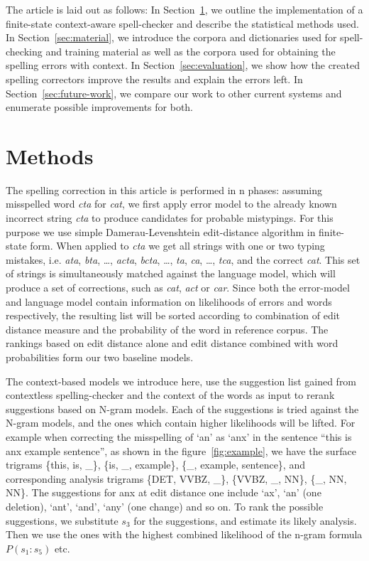 \documentclass{llncs}
\begin{document}
The article is laid out as follows: In Section~\ref{sec:methods}, we outline
the implementation of a finite-state context-aware spell-checker and describe
the statistical methods used.  In Section~\ref{sec:material}, we introduce the
corpora and dictionaries used for spell-checking and training material as well
as the corpora used for obtaining the spelling errors with context. In
Section~\ref{sec:evaluation}, we show how the created spelling correctors
improve the results and explain the errors left. In
Section~\ref{sec:future-work}, we compare our work to other current systems and
enumerate possible improvements for both.

\section{Methods}
\label{sec:methods}

The spelling correction in this article is performed in n phases: assuming 
misspelled word \emph{cta} for \emph{cat}, we first apply error model to
the already known incorrect string \emph{cta} to produce candidates for probable
mistypings. For this purpose we use simple Damerau-Levenshtein edit-distance
algorithm in finite-state form. When applied to \emph{cta} we get all strings
with one or two typing mistakes, i.e. \emph{ata}, \emph{bta}, \ldots, 
\emph{acta}, \emph{bcta}, \ldots, \emph{ta}, \emph{ca}, \ldots, \emph{tca}, and
the correct \emph{cat}. This set of strings is simultaneously matched against
the language model, which will produce a set of corrections, such as 
\emph{cat}, \emph{act} or \emph{car}. Since both the error-model and language
model contain information on likelihoods of errors and words respectively, the
resulting list will be sorted according to combination of edit distance measure
and the probability of the word in reference corpus. The rankings based on
edit distance alone and edit distance combined with word probabilities form
our two baseline models. 

The context-based models we introduce here, use the suggestion list gained
from contextless spelling-checker and the context of the words as input to
rerank suggestions based on N-gram models. Each of the suggestions is tried
against the N-gram models, and the ones which contain higher likelihoods will
be lifted.
For example when correcting the misspelling of `an' as `anx' in the sentence ``this
is anx example sentence'', as shown in the figure~\ref{fig:example}, we have
the surface trigrams \{this, is, \_\}, \{is, \_, example\}, \{\_, example,
sentence\}, and corresponding analysis trigrams \{DET, VVBZ, \_\}, \{VVBZ, \_,
NN\}, \{\_, NN, NN\}. The suggestions for anx at edit distance one include
`ax', `an' (one deletion), `ant', `and', `any' (one change) and so on. To rank the
possible suggestions, we substitute $s_3$ for the suggestions, and estimate its
likely analysis. Then we use the ones with the highest combined likelihood of the n-gram
formula $P(s_1:s_5)$ etc.
\end{document}
